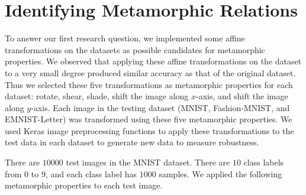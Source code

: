 \section{Identifying Metamorphic Relations} \label{identifyingMR}
To answer our first research question, we implemented some affine transformations on the datasets as possible candidates for metamorphic properties. We observed that applying these affine transformations on the dataset to a very small degree produced similar accuracy as that of the original dataset. Thus we selected these five transformations as metamorphic properties for each dataset: rotate, shear, shade, shift the image along $x$-axis, and shift the image along $y$-axis. Each image in the testing dataset (MNIST, Fashion-MNIST, and EMNIST-Letter) was transformed using these five metamorphic properties. We used Keras image preprocessing functions to apply these transformations to the test data in each dataset to generate new data to measure robustness.

There are $10000$ test images in the MNIST dataset. There are $10$ class labels from $0$ to $9$, and each class label has $1000$ samples. We applied the following metamorphic properties to each test image.
